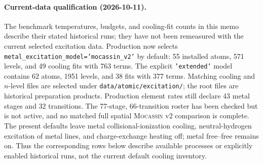 \documentclass[english,a4paper]{my_memo}
\newcommand{\code}[1]{\texttt{#1}}
\newcommand{\Cloudy}{\textsc{Cloudy}}
\newcommand{\Mocassin}{\textsc{Mocassin}}
\newcommand{\nel}{n_{\rm e}}
\begin{document}
\begin{abstract}
at nebular densities, leaving both benchmarks at the cool edge of the range;
suppressing the line cooling to the local $\nel$ with a $(T, \nel)$ table built
from the same $n$-level solve --- now the default,
\code{par\%cooling\_model = local\_ne} --- removes the far-infrared
overestimate, brings the fixed-state line total from $1.116\times$ to
$1.01\times$ \Cloudy{}'s, and superseded the two zero-density temperatures at
once by 8211 and 7025~K, matching \Cloudy{} c25.00 (8210, 6910~K); the
zero-density fits are retained as the \code{low\_density} option.  Later
changes to the radiation field, the atomic data and the stopping test, none of
them in the cooling function, carry the current figures (run \code{m11},
2026-09-27) to \textbf{8180~K} at HII40 --- inside the published
$7720$--$8199$~K range and $0.37\%$ below \Cloudy{}'s 8210~K --- and
\textbf{6940~K} at HII20, which sits above the published $6402$--$6749$~K range
but within $0.43\%$ of \Cloudy{} c25.00's 6910~K, itself above that range: both
current-generation codes run hotter than the 1995-era HII20 spread, and they
agree with each other.
A comparison of the cooling
inventories of the other Monte Carlo photoionization codes is included; it
turned up defects on their side as well, and one omission common to all five
codes.
\end{abstract}

\paragraph{Current-data qualification (2026-10-11).}
The benchmark temperatures, budgets, and cooling-fit counts in this memo
describe their stated historical runs; they have not been remeasured with
the current selected excitation data. Production now selects
\code{metal\_excitation\_model='mocassin\_v2'} by default: 55 installed atoms,
571 levels, and 49 cooling fits with 763 terms. The explicit
\code{'extended'} model contains 62 atoms, 1951 levels, and 38 fits with
377 terms. Matching cooling and $n$-level files are selected under
\code{data/atomic/excitation/}; the root files are historical preparation
products. Production element rates still declare 43 metal stages and 32
transitions. The 77-stage, 66-transition roster has been checked but is not
active, and no matched full spatial \Mocassin{} v2 comparison is complete.
The present defaults leave metal collisional-ionization cooling,
neutral-hydrogen excitation of metal lines, and charge-exchange heating off;
metal free--free remains on. Thus the corresponding rows below describe
available processes or explicitly enabled historical runs, not the current
default cooling inventory.
\end{document}
